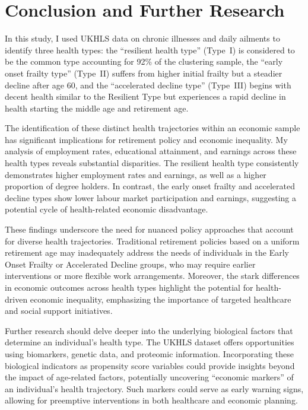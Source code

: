 \section{Conclusion and Further Research}
In this study, I used UKHLS data on chronic illnesses and daily ailments to identify three health types: the ``resilient health type'' (Type~I) is considered to be the common type accounting for 92\% of the clustering sample, the ``early onset frailty type'' (Type~II) suffers from higher initial frailty but a steadier decline after age 60, and the ``accelerated decline type'' (Type~III) begins with decent health similar to the Resilient Type but experiences a rapid decline in health starting the middle age and retirement age.

The identification of these distinct health trajectories within an economic sample has significant implications for retirement policy and economic inequality. My analysis of employment rates, educational attainment, and earnings across these health types reveals substantial disparities. The resilient health type consistently demonstrates higher employment rates and earnings, as well as a higher proportion of degree holders. In contrast, the early onset frailty and accelerated decline types show lower labour market participation and earnings, suggesting a potential cycle of health-related economic disadvantage.

These findings underscore the need for nuanced policy approaches that account for diverse health trajectories. Traditional retirement policies based on a uniform retirement age may inadequately address the needs of individuals in the Early Onset Frailty or Accelerated Decline groups, who may require earlier interventions or more flexible work arrangements. Moreover, the stark differences in economic outcomes across health types highlight the potential for health-driven economic inequality, emphasizing the importance of targeted healthcare and social support initiatives.

Further research should delve deeper into the underlying biological factors that determine an individual's health type. The UKHLS dataset offers opportunities using biomarkers, genetic data, and proteomic information. Incorporating these biological indicators as propensity score variables could provide insights beyond the impact of age-related factors, potentially uncovering ``economic markers'' of an individual's health trajectory. Such markers could serve as early warning signs, allowing for preemptive interventions in both healthcare and economic planning.

